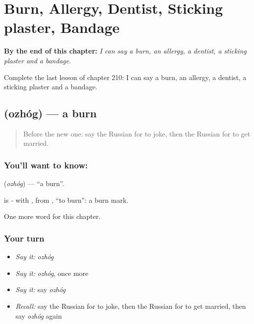 
\chapter{Burn, Allergy, Dentist, Sticking plaster, Bandage}
\label{ch:ru-burn-allergy-dentist-sticking-plaster-bandage}

\begin{chapteropening}
\textbf{By the end of this chapter:} \emph{I can say a burn, an allergy, a dentist, a sticking plaster and a bandage.}

Complete the last lesson of chapter 210: I can say a burn, an allergy, a dentist, a sticking plaster and a bandage.
\end{chapteropening}

\section[\texorpdfstring{\ru{ожог} (ozhóg)}{ожог (ozhóg)}]{ (ozhóg) — a burn}

\label{lesson:RU-C210-ozhog}



\begin{quote}
Before the new one: say the Russian for to joke, then the Russian for to get married.
\end{quote}

\subsection*{You'll want to know: }
\textbf{} (\emph{ozhóg}) — \textquotedblleft{}a burn\textquotedblright{}.

\begin{cousinweb}
\textbf{} is \emph{-} with \emph{}, from \emph{}, \textquotedblleft{}to burn\textquotedblright{}: a burn mark.
\end{cousinweb}

\begin{grammarlens}[title={What you've built}]
One more word for this chapter.
\end{grammarlens}

\subsection*{Your turn}
\begin{itemize}
\raggedright
  \item \emph{Say it:} \emph{ozhóg}
  \item \emph{Say it:} \emph{ozhóg}, once more
  \item \emph{Say it:} say \emph{ozhóg}
  \item \emph{Recall:} say the Russian for to joke, then the Russian for to get married, then say \emph{ozhóg} again
\end{itemize}

